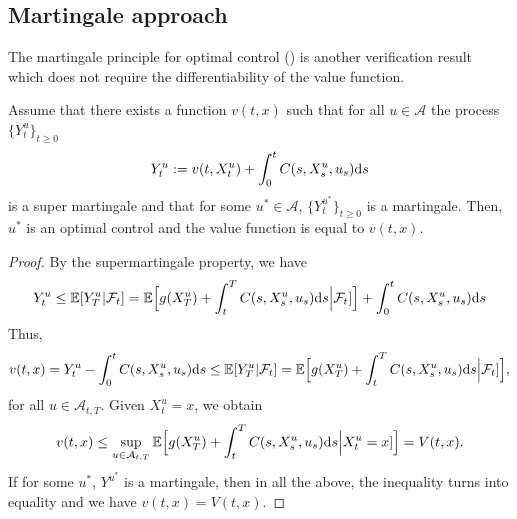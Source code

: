 \documentclass[11pt]{book}
\newcommand{\dd}{\text{\normalfont d}}
\newcommand{\ds}{\text{\normalfont d}s}
\begin{document}
\subsection{Martingale approach}\label{sec:martingale}
The martingale principle for optimal control (\cite{DV73}) is another verification result which does not require the differentiability of the value function.
\begin{thm}\label{thm:martingale_verification}
	Assume that there exists a function $v(t,x)$ such that for all $u\in\mathcal{A}$ the process $\{Y^u_t\}_{t\ge0}$
	\begin{equation}
		Y^u_t:=v(t,X_t^u)+\int_0^tC(s,X_s^u,u_s){{\ds}}
	\end{equation}
	is a super martingale and that for some $u^*\in\mathcal{A}$, $\{Y^{u^*}_t\}_{t\ge0}$ is a martingale. Then, $u^*$ is an optimal control and the value function is equal to $v(t,x)$.
\end{thm}
\begin{proof}
By the supermartingale property, we have
\begin{equation}
Y^u_t\le\mathbb{E}[Y^u_T|\mathcal{F}_t]=\mathbb{E}\Big[g(X_T^u)+\int_t^TC(s,X_s^u,u_s){{\ds}}\Big|\mathcal{F}_t]\Big]+\int_0^tC(s,X_s^u,u_s){{\ds}}
\end{equation}
Thus, 
\begin{equation}
v(t,x)=Y^u_t-\int_0^tC(s,X_s^u,u_s){{\ds}}\le\mathbb{E}[Y^u_T|\mathcal{F}_t]=\mathbb{E}\Big[g(X_T^u)+\int_t^TC(s,X_s^u,u_s){{\ds}}\Big|\mathcal{F}_t]\Big],
\end{equation}
for all $u\in\mathcal{A}_{t,T}$. Given $X_t^u=x$, we obtain
\begin{equation}
v(t,x)\le\sup_{u\in\mathcal{A}_{t,T}}\mathbb{E}\Big[g(X_T^u)+\int_t^TC(s,X_s^u,u_s){{\ds}}\Big|X_t^u=x]\Big]=V(t,x).
\end{equation}
If for some $u^*$, $Y^{u^*}$ is a martingale, then in all the above, the inequality turns into equality and we have $v(t,x)=V(t,x)$.
\end{proof}
\end{document}
